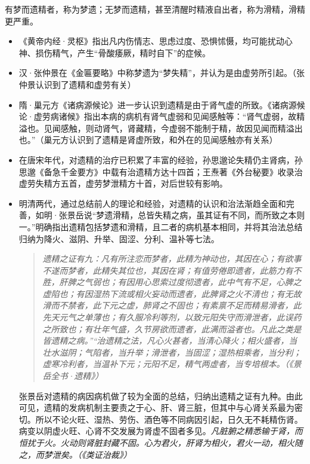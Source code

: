 有梦而遗精者，称为梦遗；无梦而遗精，甚至清醒时精液自出者，称为滑精，滑精更严重。

\begin{itemize}
    \item 《黄帝内经·灵枢》指出凡内伤情志、思虑过度、恐惧怵慑，均可能扰动心神、损伤精气，产生“骨酸痿厥，精时自下”的症候。
    \item 汉·张仲景在《金匾要略》中称梦遗为“梦失精”，并认为是由虚劳所引起。（张仲景认识到了遗精和虚劳有关）
    \item 隋·巢元方《诸病源候论》进一步认识到遗精是由于肾气虚的所致。《诸病源候论·虚劳病诸候》指出本病的病机有肾气虚弱和见闻感触等：“肾气虚弱，故精溢也。见闻感触，则动肾气，肾藏精，今虚弱不能制于精，故因见闻而精溢出也。”（巢元方认识到了遗精是肾虚所致，和外在的见闻感触亦有关系）
    \item 在唐宋年代，对遗精的治疗已积累了丰富的经验，孙思邈论失精仍主肾病，孙思邈《备急千金要方》中载有治遗精方达十四首；王焘著《外台秘要》收录治虚劳失精方五首，虚劳梦泄精方十首，对后世较有影响。
    \item 明清两代，通过总结前人的理论和经验，对遗精的认识和治法渐趋全面和完善，如明·张景岳说“梦遗滑精，总皆失精之病，虽其证有不同，而所致之本则一。”明确指出遗精包括梦遗和滑精，且二者的病机基本相同，并将其治法总结归纳为降火、滋阴、升举、固涩、分利、温补等七法。\begin{quote}\it
              遗精之证有九：凡有所注恋而梦者，此精为神动也，其因在心；有欲事不遂而梦者，此精失其位也，其因在肾；有值劳倦即遗者，此筋力有不胜，肝脾之气弱也；有因用心思索过度彻遗者，此中气有不足，心脾之虚陷也；有因湿热下流或相火妄动而遗者，此脾肾之火不清也；有无故滑而不禁者，此下元之虚，肺肾之不固也；有素禀不足而精易滑者，此先天元气之单薄也；有久服冷利等剂，以致元阳失守而滑泄者，此误药之所致也；有壮年气盛，久节房欲而遗者，此满而溢者也。凡此之类是皆遗精之病。”“治遗精之法，凡心火甚者，当清心降火；相火盛者，当壮水滋阴；气陷者，当升举；滑泄者，当固涩；湿热相乘者，当分利；虚寒冷利者，当温补下元；元阳不足，精气两虚者，当专培根本。（《景岳全书·遗精》）
          \end{quote} 张景岳对遗精的病因病机做了较为全面的总结，归纳出遗精之证有九种。由此可见，遗精的发病机制主要责之于心、肝、肾三脏，但其中与心肾关系最为密切。所以不论火旺、湿热、劳伤、酒色等不同病因引起，日久无不耗精伤肾。病变以阴虚火旺、心肾不交发展为肾虚不固者多见。\textit{凡脏腑之精悉输于肾，而恒扰于火。火动则肾脏封藏不固。心为君火，肝肾为相火，君火一动，相火随之，而梦泄矣。（《类证治裁》）}
\end{itemize}

